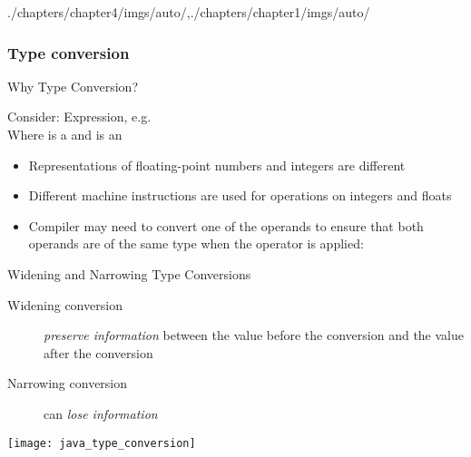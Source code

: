 \begin{graphicspathcontext}{{./chapters/chapter4/imgs/auto/},{./chapters/chapter1/imgs/auto/}}
\begin{bibunit}[apalike]
\subsubsection{Type conversion}
\subsubsectiontableofcontentslide

\begin{frame}{Why Type Conversion?}
	\begin{block}{Consider:}
		Expression, e.g.  \\
		Where  is a  and  is an 
	\end{block}
	\vspace{.25cm}
	\begin{itemize}
	\item Representations of floating-point numbers and integers are different
	\item Different machine instructions are used for operations on integers and floats
	\item Compiler may need to convert one of the operands to ensure that both operands are of the same type when the operator is applied:
			\begin{tac}[.5\linewidth]
			\end{tac}
	\end{itemize}
	\vspace{.5cm}
\end{frame}

\begin{frame}[t]{{Widening and Narrowing} Type Conversions}
	\begin{description}
	\item[Widening conversion] \emph{preserve information} between the value before the conversion and the value after the conversion
	\item[Narrowing conversion] can \emph{lose information}
	\end{description}
	\begin{center}
		\texttt{[image: java\_type\_conversion]}
	\end{center}
\end{frame}


\end{bibunit}
\end{graphicspathcontext}
